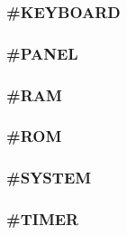 \documentclass{scrartcl}
\begin{document}
\subsubsection{\#KEYBOARD}

\subsubsection{\#PANEL}

\subsubsection{\#RAM}

\subsubsection{\#ROM}

\subsubsection{\#SYSTEM}

\subsubsection{\#TIMER}
\end{document}
